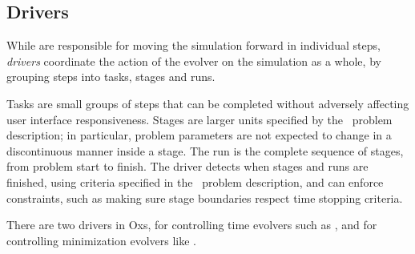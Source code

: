 \subsection{Drivers\label{sec:oxsDrivers}}
While  are
responsible for moving the simulation forward in individual steps,
\textit{drivers} coordinate the action of the evolver on the
simulation as a whole, by grouping steps into tasks, stages and runs.

Tasks are small groups of steps that can be completed without adversely
affecting user interface responsiveness.  Stages are larger units
specified by the \MIF\ problem description; in particular, problem
parameters are not expected to change in a discontinuous manner inside a
stage.  The run is the complete sequence of stages, from problem start to
finish.  The driver detects when stages and runs are finished, using
criteria specified in the \MIF\ problem description, and can enforce
constraints, such as making sure stage boundaries respect time stopping
criteria.

There are two drivers in Oxs,
for controlling time evolvers such as
,
and
for controlling minimization evolvers like
.

